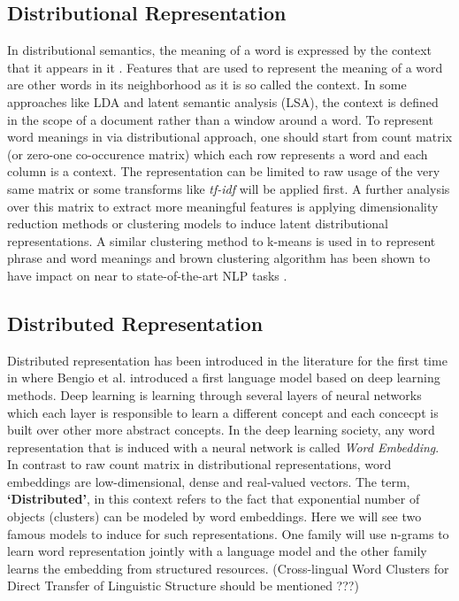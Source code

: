 \documentclass[preprint,12pt]{elsarticle}
\begin{document}
\subsection{Distributional Representation}
\label{subsec:distl-repr}
In distributional semantics, the meaning of a word is expressed by the context
that it appears in it \cite{Harris1981}. Features that are used to represent the
meaning of a word are other words in its neighborhood as it is so called the
context. In some approaches like LDA and latent semantic analysis (LSA), 
the context is defined in the scope of a document rather than a window around a
word. To represent word meanings in via distributional approach, one should
start from count matrix (or zero-one co-occurence matrix) which each row
represents a word and each column is a context. The representation can be
limited to raw usage of the very same matrix or some transforms like
\emph{tf-idf} will be applied first. A further analysis over this matrix to
extract more meaningful features is applying dimensionality reduction methods or
clustering models to induce latent distributional representations. A similar
clustering method to k-means is used in \cite{Lin2009} to represent phrase and
word meanings and brown clustering algorithm \cite{Brown1992} has been shown to
have impact on near to state-of-the-art NLP tasks \cite{Turian2010b}. 


\subsection{Distributed Representation}
\label{rel-work:disted-repr}
Distributed representation has been introduced in the literature for the first
time in \cite{Bengio2003} where Bengio et al. introduced a first language
model based on deep learning methods\cite{Bengio2009b}. Deep learning is
learning through several layers of neural networks which each layer is
responsible to learn a different concept and each concecpt is built over other
more abstract concepts. In the deep learning society, any word representation
that is induced with a neural network is called \emph{Word Embedding}. 
In contrast to raw count matrix in distributional representations, word embeddings are low-dimensional, dense and real-valued vectors.
 The term, \textbf{`Distributed'}, in this context refers to the fact that
 exponential number of objects (clusters) can be modeled by word embeddings.
 Here we will see two famous models to induce for such representations. One
 family will use n-grams to learn word representation jointly with a language
 model and the other family learns the embedding from structured resources.
(Cross-lingual Word Clusters for Direct Transfer of Linguistic Structure should be mentioned ???)
\end{document}
